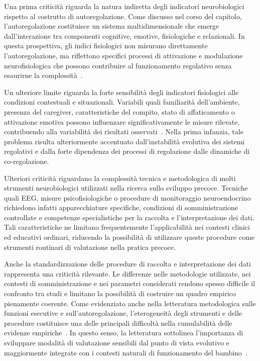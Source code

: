             Una prima criticità riguarda la natura indiretta degli indicatori neurobiologici rispetto al costrutto di autoregolazione. Come discusso nel corso del capitolo, l'autoregolazione costituisce un sistema multidimensionale che emerge dall'interazione tra componenti cognitive, emotive, fisiologiche e relazionali. In questa prospettiva, gli indici fisiologici non misurano direttamente l'autoregolazione, ma riflettono specifici processi di attivazione e modulazione neurofisiologica che possono contribuire al funzionamento regolativo senza esaurirne la complessità~\cite{cole2004,blair2015}.

            Un ulteriore limite riguarda la forte sensibilità degli indicatori fisiologici alle condizioni contestuali e situazionali. Variabili quali familiarità dell'ambiente, presenza del caregiver, caratteristiche del compito, stato di affaticamento o attivazione emotiva possono influenzare significativamente le misure rilevate, contribuendo alla variabilità dei risultati osservati~\cite{doebel2020}. Nella prima infanzia, tale problema risulta ulteriormente accentuato dall'instabilità evolutiva dei sistemi regolativi e dalla forte dipendenza dei processi di regolazione dalle dinamiche di co-regolazione.

            Ulteriori criticità riguardano la complessità tecnica e metodologica di molti strumenti neurobiologici utilizzati nella ricerca sullo sviluppo precoce. Tecniche quali EEG, misure psicofisiologiche o procedure di monitoraggio neuroendocrino richiedono infatti apparecchiature specifiche, condizioni di somministrazione controllate e competenze specialistiche per la raccolta e l'interpretazione dei dati. Tali caratteristiche ne limitano frequentemente l'applicabilità nei contesti clinici ed educativi ordinari, riducendo la possibilità di utilizzare queste procedure come strumenti routinari di valutazione nella pratica precoce.

            Anche la standardizzazione delle procedure di raccolta e interpretazione dei dati rappresenta una criticità rilevante. Le differenze nelle metodologie utilizzate, nei contesti di somministrazione e nei parametri considerati rendono spesso difficile il confronto tra studi e limitano la possibilità di costruire un quadro empirico pienamente coerente. Come evidenziato anche nella letteratura metodologica sulle funzioni esecutive e sull'autoregolazione, l'eterogeneità degli strumenti e delle procedure costituisce una delle principali difficoltà nella cumulabilità delle evidenze empiriche~\cite{toplak2013,snyder2021}. In questo senso, la letteratura sottolinea l'importanza di sviluppare modalità di valutazione sensibili dal punto di vista evolutivo e maggiormente integrate con i contesti naturali di funzionamento del bambino~\cite{mcclelland2012}.

